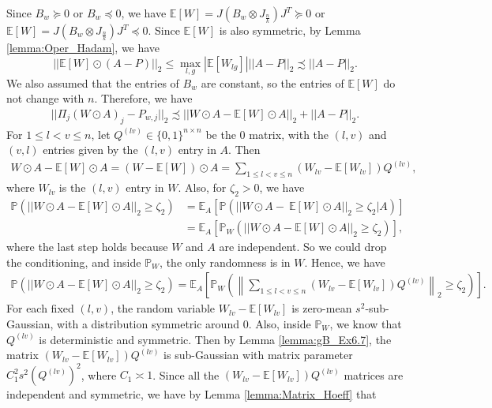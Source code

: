 \documentclass{article}
\begin{document}
Since $B_w \succeq 0$ or $B_w \preceq 0$, we have $\mathbb{E}[W] = J(B_w\otimes J_{\frac{n}{k}})J^T \succeq 0$ or $\mathbb{E}[W] = J(B_w\otimes J_{\frac{n}{k}})J^T \preceq 0$. Since $\mathbb{E}[W]$ is also symmetric, by Lemma \ref{lemma:Oper_Hadam}, we have
\begin{equation*}
||\mathbb{E}[W]\odot (A - P)||_2 \leq \mathop{\max}_{l, g}|\mathbb{E}[W_{lg}]|||A - P||_2 \precsim ||A - P||_2.
\end{equation*}
We also assumed that the entries of $B_w$ are constant, so the entries of $\mathbb{E}[W]$ do not change with $n$. Therefore, we have
\begin{align}
\label{eq:W_Pi_j_P_j}
||\Pi_j(W \odot A)_j -  P_{w, j}||_2 \precsim ||W \odot A - \mathbb{E}[W]\odot A||_2 + ||A - P||_2.
\end{align}
For $1 \leq l < v \leq n$, let $Q^{(lv)} \in \{0, 1\}^{n \times n}$ be the $0$ matrix, with the $(l, v)$ and $(v, l)$ entries given by the $(l, v)$ entry in $A$. Then
\begin{align*}
W \odot A - \mathbb{E}[W]\odot A = (W - \mathbb{E}[W])\odot A = \sum_{1 \leq l < v \leq n}(W_{lv} - \mathbb{E}[W_{lv}])Q^{(lv)},  
\end{align*}
where $W_{lv}$ is the $(l, v)$ entry in $W$. Also, for $\zeta_2 > 0$, we have
\begin{align*}
\mathbb{P}\left(||W \odot A - \mathbb{E}[W]\odot A||_2 \geq \zeta_2\right) & = \mathbb{E}_A\left[\mathbb{P}\left(||W \odot A - \ \mathbb{E}[W]\odot A||_2 \geq \zeta_2| A\right)\right] \\
%
& = \mathbb{E}_A\left[\mathbb{P}_W\left(||W \odot A - \mathbb{E}[W]\odot  A||_2 \geq \zeta_2\right)\right],
\end{align*}
where the last step holds because $W$ and $A$ are independent. So we could drop the conditioning, and inside $\mathbb{P}_W$, the only randomness is in $W$. Hence, we have
\begin{align*}
\mathbb{P}\left(||W \odot A - \mathbb{E}[W]\odot A||_2 \geq \zeta_2\right) = \mathbb{E}_A\left[\mathbb{P}_W\left(\left\|\sum_{1 \leq l < v \leq n}(W_{lv} - \mathbb{E}[W_{lv}])Q^{(lv)}\right\|_2 \geq \zeta_2\right)\right].
\end{align*}
For each fixed $(l, v)$, the random variable $W_{lv} - \mathbb{E}[W_{lv}]$ is zero-mean $s^2$-sub-Gaussian, with a distribution symmetric around $0$. Also, inside $\mathbb{P}_W$, we know that $Q^{(lv)}$ is deterministic and symmetric. Then by Lemma \ref{lemma:gB_Ex6.7}, the matrix $(W_{lv} - \mathbb{E}[W_{lv}])Q^{(lv)}$ is sub-Gaussian with matrix parameter $C_1^2s^2(Q^{(lv)})^2$, where $C_1 \asymp 1$. Since all the $(W_{lv} - \mathbb{E}[W_{lv}])Q^{(lv)}$ matrices are independent and symmetric, we have by Lemma \ref{lemma:Matrix_Hoeff} that
\end{document}
